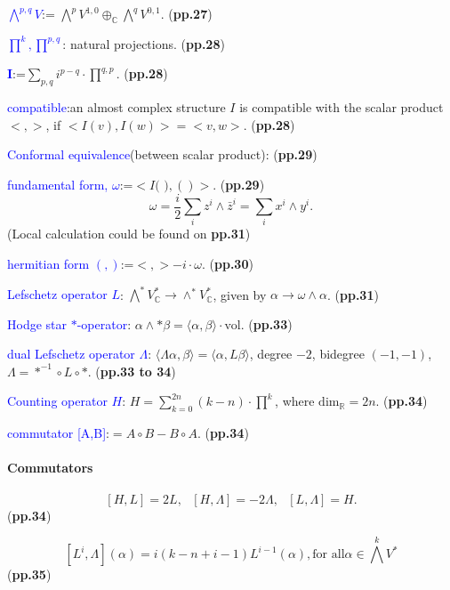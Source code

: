 \documentclass{book}
\numberwithin{equation}{subsection} %
\theoremstyle{definition}
\begin{document}
    \textcolor{blue}{$\bigwedge^{p,q} V$}:=
    $\bigwedge^p V^{1,0}\oplus_{\mathbb{C}}\bigwedge^q V^{0,1}$.
    (\textbf{pp.27})

    \textcolor{blue}{$\prod^k,\prod^{p,q}$}: natural projections.
    (\textbf{pp.28})
    
    \textcolor{blue}{$\mathbf{I}$}:=$\sum_{p,q}i^{p-q}\cdot\prod^{q,p}$.
    (\textbf{pp.28})

    \textcolor{blue}{compatible}:an almost complex structure $I$ is
    compatible with the scalar product $<,>$, if $<I(v),I(w)>=<v,w>$.
    (\textbf{pp.28})

    \textcolor{blue}{Conformal equivalence}(between scalar product):
    (\textbf{pp.29})

    \textcolor{blue}{fundamental form, $\omega$}:=$<I\text{( )},()>.$
    (\textbf{pp.29})
    $$\omega=\frac{i}{2}\sum_i z^i\wedge\bar{z}^i=\sum_i x^i\wedge y^i.$$
    \quad(Local calculation could be found on \textbf{pp.31})

    \textcolor{blue}{hermitian form $(,)$}:=$<,>-i\cdot\omega$.
    (\textbf{pp.30})

    \textcolor{blue}{Lefschetz operator $L$}:
        $\bigwedge^* V^*_{\mathbb{C}}\to
    \wedge^* V_{\mathbb{C}}^*$, given by $\alpha\to\omega\wedge\alpha$.
    (\textbf{pp.31})

    \textcolor{blue}{Hodge star $*$-operator}: $\alpha\wedge *\beta=
        \langle\alpha,\beta\rangle \cdot \text{vol}$.
    (\textbf{pp.33})

    \textcolor{blue}{dual Lefschetz operator $\Lambda$}:
        $\langle\Lambda\alpha,\beta\rangle =\langle\alpha,L\beta\rangle$,
        degree $-2$, bidegree $(-1,-1)$, $\Lambda=*^{-1}\circ L\circ *$.
    (\textbf{pp.33 to 34})

    \textcolor{blue}{Counting operator $H$}:
        $H=\sum_{k=0}^{2n}(k-n)\cdot\prod^k$, 
        where $\text{dim}_{\mathbb{R}}=2n$.
    (\textbf{pp.34})

    \textcolor{blue}{commutator [A,B]}:$=A\circ B-B\circ A$.
    (\textbf{pp.34})


\paragraph{Commutators}
$$[H,L]=2L,\text{ } [H,\Lambda]=-2\Lambda,\text{ } [L,\Lambda]=H.$$
(\textbf{pp.34})

$$[L^i,\Lambda](\alpha)= i(k-n+i-1)L^{i-1}(\alpha),\text{for all}
    \alpha\in\bigwedge^k V^*$$
(\textbf{pp.35})
\end{document}
